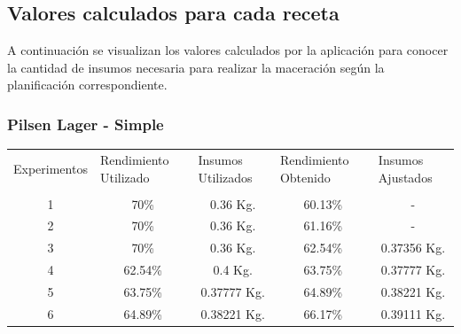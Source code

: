     \subsection{Valores calculados para cada receta}
    \par A continuación se visualizan los valores calculados por la aplicación para conocer la cantidad de insumos necesaria para realizar la maceración según la planificación correspondiente.
        \subsubsection{Pilsen Lager - Simple}
    
    \begin{minipage}{0.95\textwidth}    
    
        \centering
        \begin{tabularx}{\textwidth}{|X|X|X|X|X|}
             \hline
             \multicolumn{1}{|c|}{Experimentos} & \multirow{1}{2cm}{Rendimiento Utilizado} &\multirow{1}{2cm}{Insumos Utilizados}  & \multirow{1}{2cm}{Rendimiento Obtenido} &\multirow{1}{2cm}{Insumos Ajustados}\\
             & & & &\\
             \hline
             \hline
             \multicolumn{1}{|c|}{1} & \multicolumn{1}{c|}{70\%} & \multicolumn{1}{c|}{0.36 Kg.} &\multicolumn{1}{c|}{60.13\%} &\multicolumn{1}{c|}{-} \\
             \hline
             \multicolumn{1}{|c|}{2} & \multicolumn{1}{c|}{70\%}  & \multicolumn{1}{c|}{0.36 Kg.} &\multicolumn{1}{c|}{61.16\%} &\multicolumn{1}{c|}{-} \\
             \hline
             \multicolumn{1}{|c|}{3} & \multicolumn{1}{c|}{70\%} & \multicolumn{1}{c|}{0.36 Kg.} &\multicolumn{1}{c|}{62.54\%} &\multicolumn{1}{c|}{0.37356 Kg.} \\
             \hline
             \multicolumn{1}{|c|}{4} & \multicolumn{1}{c|}{62.54\%}  & \multicolumn{1}{c|}{0.4 Kg.} &\multicolumn{1}{c|}{63.75\%} &\multicolumn{1}{c|}{0.37777 Kg.} \\
             \hline
             \multicolumn{1}{|c|}{5} & \multicolumn{1}{c|}{63.75\%}  & \multicolumn{1}{c|}{0.37777 Kg.} &\multicolumn{1}{c|}{64.89\%} &\multicolumn{1}{c|}{0.38221 Kg.} \\
             \hline
             \multicolumn{1}{|c|}{6} & \multicolumn{1}{c|}{64.89\%}  & \multicolumn{1}{c|}{0.38221 Kg.} &\multicolumn{1}{c|}{66.17\%} &\multicolumn{1}{c|}{0.39111 Kg.} \\

\end{tabularx}
\end{minipage}
